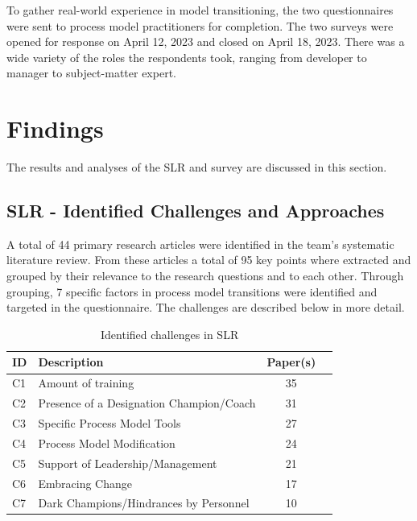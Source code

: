 \documentclass[conference]{IEEEtran}
\begin{document}
To gather real-world experience in model transitioning, the two questionnaires were sent to process model practitioners for completion. The two surveys were opened for response on April 12, 2023 and closed on April 18, 2023. There was a wide variety of the roles the respondents took, ranging from developer to manager to subject-matter expert.

\section{Findings}
The results and analyses of the SLR and survey are discussed in this section.

\subsection{SLR - Identified Challenges and Approaches}
A total of 44 primary research articles were identified in the team's systematic literature review. From these articles a total of 95 key points where extracted and grouped by their relevance to the research questions and to each other. Through grouping, 7 specific factors in process model transitions were identified and targeted in the questionnaire\cite{7477924, 9140091, 7765512, 7170402, 6702805, 8469577, 8802694, 6633979, 7302487, 8113260, 6984105, 10017407, 10049356, 7496585, 8102324, 9522254, 8498180, 8741796, 7284602, 9753613, 6986021, 9117324, 9137917, 8560640, 10.1145/1987875.1987901, 10.1145/3466933.3466962, 170231, 4293607, 8977654, 8672701, 9524860, 9049291, 9141094, 7602985, 9882761, 9337750}. The challenges are described below in more detail.
\begin{table}[htp]
    \centering
    \caption{Identified challenges in SLR}
    \label{tab:ChalAndApproach}
    \begin{tabular}{ p{1.5cm} l c c}
        \hline
        \textbf{ID}  &   \textbf{Description}    & \textbf{Paper(s)}  \\ \hline
         C1   &  Amount of training &  35 \\ 
         C2   &  Presence of a Designation Champion/Coach & 31  \\ 
         C3   &  Specific Process Model Tools & 27  \\ 
         C4   &  Process Model Modification & 24  \\ 
         C5   &  Support of Leadership/Management & 21  \\ 
         C6   &  Embracing Change & 17  \\ 
         C7   &  Dark Champions/Hindrances by Personnel & 10  \\ \hline 
    \end{tabular} \vspace{1mm}
\end{table}
\end{document}
